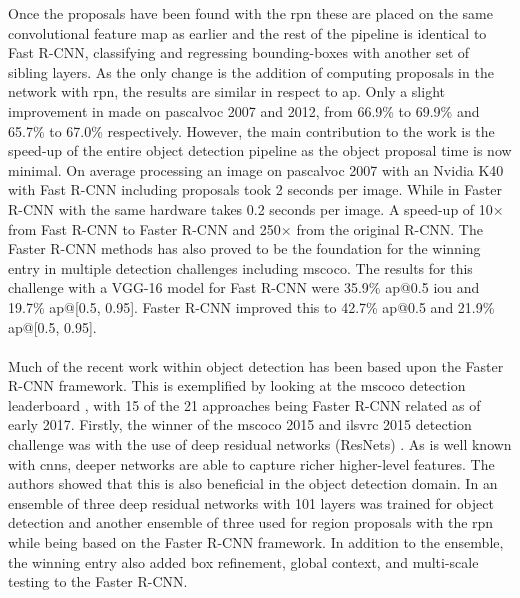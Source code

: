 \documentclass[a4paper,twoside]{article}
\begin{document}
Once the proposals have been found with the \gls{rpn} these are placed on the same convolutional feature map as earlier and the rest of the pipeline is identical to Fast R-CNN, classifying and regressing bounding-boxes with another set of sibling layers. As the only change is the addition of computing proposals in the network with \gls{rpn}, the results are similar in respect to \gls{ap}. Only a slight improvement in made on \gls{pascalvoc} 2007 and 2012, from 66.9\% to 69.9\% and 65.7\% to 67.0\% respectively. However, the main contribution to the work is the speed-up of the entire object detection pipeline as the object proposal time is now minimal. On average processing an image on \gls{pascalvoc} 2007 with an Nvidia K40 with Fast R-CNN including proposals took 2 seconds per image. While in Faster R-CNN with the same hardware takes 0.2 seconds per image. A speed-up of 10$\times$ from Fast R-CNN to Faster R-CNN and 250$\times$ from the original R-CNN. The Faster R-CNN methods has also proved to be the foundation for the winning entry in multiple detection challenges including \gls{mscoco}. The results for this challenge with a VGG-16 model for Fast R-CNN were 35.9\% \gls{ap}@0.5 \gls{iou} and 19.7\% \gls{ap}@[0.5, 0.95]. Faster R-CNN improved this to 42.7\% \gls{ap}@0.5 and 21.9\% \gls{ap}@[0.5, 0.95].
\\\\
Much of the recent work within object detection has been based upon the Faster R-CNN framework. This is exemplified by looking at the \gls{mscoco} detection leaderboard \cite{cocolead}, with 15 of the 21 approaches being Faster R-CNN related as of early 2017. Firstly, the winner of the \gls{mscoco} 2015 and \gls{ilsvrc} 2015 detection challenge was with the use of deep residual networks (ResNets) \cite{deepres}. As is well known with \glspl{cnn}, deeper networks are able to capture richer higher-level features. The authors showed that this is also beneficial in the object detection domain. In \cite{deepres} an ensemble of three deep residual networks with 101 layers was trained for object detection and another ensemble of three used for region proposals with the \gls{rpn} while being based on the Faster R-CNN framework. In addition to the ensemble, the winning entry also added box refinement, global context, and multi-scale testing to the Faster R-CNN.
\\\\
\end{document}
